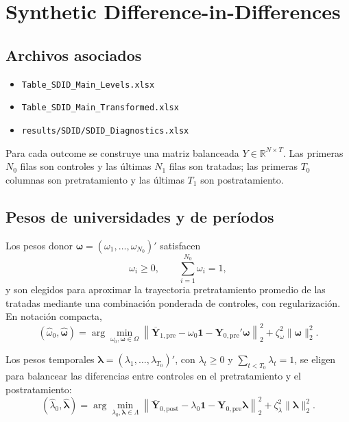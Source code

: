 \documentclass[11pt]{article}
\newcommand{\file}[1]{\texttt{#1}}
\begin{document}
\section{Synthetic Difference-in-Differences}

\subsection*{Archivos asociados}
\begin{itemize}
 \item \file{Table\_SDID\_Main\_Levels.xlsx}
 \item \file{Table\_SDID\_Main\_Transformed.xlsx}
 \item \file{results/SDID/SDID\_Diagnostics.xlsx}
\end{itemize}

Para cada outcome se construye una matriz balanceada $Y\in\mathbb R^{N\times T}$.
Las primeras $N_0$ filas son controles y las últimas $N_1$ filas son tratadas;
las primeras $T_0$ columnas son pretratamiento y las últimas $T_1$ son
postratamiento.

\subsection{Pesos de universidades y de períodos}

Los pesos donor $\boldsymbol\omega=(\omega_1,\ldots,\omega_{N_0})'$ satisfacen
\begin{equation}
 \omega_i\geq 0,\qquad \sum_{i=1}^{N_0}\omega_i=1,
\end{equation}
y son elegidos para aproximar la trayectoria pretratamiento promedio de las
tratadas mediante una combinación ponderada de controles, con regularización.
En notación compacta,
\begin{equation}
 (\widehat\omega_0,\widehat{\boldsymbol\omega})
 =\arg\min_{\omega_0,\boldsymbol\omega\in\Omega}
 \left\|
 \overline{\mathbf Y}_{1,\mathrm{pre}}
 -\omega_0\mathbf 1
 -\mathbf Y_{0,\mathrm{pre}}'\boldsymbol\omega
 \right\|_2^2
 +\zeta_\omega^2\|\boldsymbol\omega\|_2^2.
 \label{eq:omega}
\end{equation}

Los pesos temporales $\boldsymbol\lambda=(\lambda_1,\ldots,\lambda_{T_0})'$,
con $\lambda_t\geq0$ y $\sum_{t<T_0}\lambda_t=1$, se eligen para balancear
las diferencias entre controles en el pretratamiento y el postratamiento:
\begin{equation}
 (\widehat\lambda_0,\widehat{\boldsymbol\lambda})
 =\arg\min_{\lambda_0,\boldsymbol\lambda\in\Lambda}
 \left\|
 \overline{\mathbf Y}_{0,\mathrm{post}}
 -\lambda_0\mathbf 1
 -\mathbf Y_{0,\mathrm{pre}}\boldsymbol\lambda
 \right\|_2^2
 +\zeta_\lambda^2\|\boldsymbol\lambda\|_2^2.
 \label{eq:lambda}
\end{equation}
\end{document}

